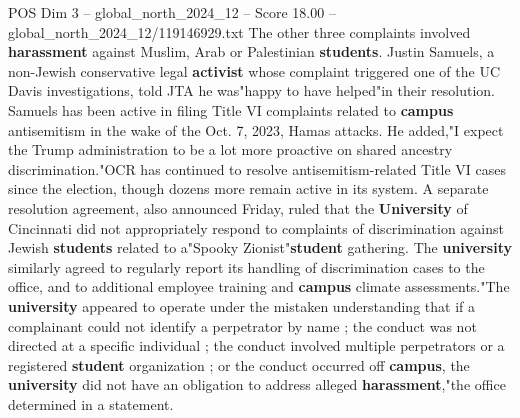 \begin{textsample}{POS Dim 3 – global\_north\_2024\_12 – Score 18.00 – global\_north\_2024\_12/119146929.txt}
The other three complaints involved \textbf{harassment} against Muslim, Arab or Palestinian \textbf{students}.
Justin Samuels, a non-Jewish conservative legal \textbf{activist} whose complaint triggered one of the UC Davis investigations, told JTA he was"happy to have helped"in their resolution.
Samuels has been active in filing Title VI complaints related to \textbf{campus} antisemitism in the wake of the Oct. 7, 2023, Hamas attacks.
He added,"I expect the Trump administration to be a lot more proactive on shared ancestry discrimination."OCR has continued to resolve antisemitism-related Title VI cases since the election, though dozens more remain active in its system.
A separate resolution agreement, also announced Friday, ruled that the \textbf{University} of Cincinnati did not appropriately respond to complaints of discrimination against Jewish \textbf{students} related to a"Spooky Zionist"\textbf{student} gathering.
The \textbf{university} similarly agreed to regularly report its handling of discrimination cases to the office, and to additional employee training and \textbf{campus} climate assessments."The \textbf{university} appeared to operate under the mistaken understanding that if a complainant could not identify a perpetrator by name ; the conduct was not directed at a specific individual ; the conduct involved multiple perpetrators or a registered \textbf{student} organization ; or the conduct occurred off \textbf{campus}, the \textbf{university} did not have an obligation to address alleged \textbf{harassment},"the office determined in a statement.

\end{textsample}
